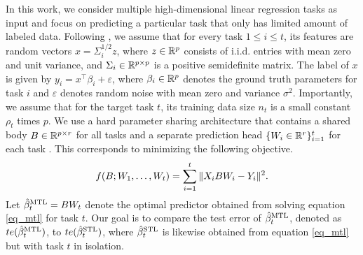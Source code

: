 In this work, we consider multiple high-dimensional linear regression tasks as input and focus on predicting a particular task that only has limited amount of labeled data.
Following \cite{HMRT19,BLLT20}, we assume that for every task $1\le i\le t$, its features are random vectors $x = \Sigma_i^{1/2}z$, where $z\in\mathbb{R}^p$ consists of i.i.d. entries with mean zero and unit variance, and $\Sigma_i\in\mathbb{R}^{p\times p}$ is a positive semidefinite matrix.
The label of $x$ is given by $y_i = x^{\top}\beta_i + \varepsilon$, where $\beta_i\in\mathbb{R}^p$ denotes the ground truth parameters for task $i$ and $\varepsilon$ denotes random noise with mean zero and variance $\sigma^2$.
Importantly, we assume that for the target task $t$, its training data size $n_t$ is a small constant $\rho_t$ times $p$. %
We use a hard parameter sharing architecture that contains a shared body $B\in\mathbb{R}^{p\times r}$ for all tasks and a separate prediction head $\{W_i \in \mathbb{R}^{r}\}_{i=1}^t$ for each task \cite{R17,MTDNN19}.
This corresponds to minimizing the following objective.
\begin{align}
	\label{eq_mtl}
	f(B; W_1, \dots, W_t) = \sum_{i=1}^t \|X_i B W_i - Y_i\|^2.
\end{align}
Let $\hat{\beta}_t^{\text{MTL}} = B W_t$ denote the optimal predictor obtained from solving equation \eqref{eq_mtl} for task $t$.
Our goal is to compare the test error of $\hat{\beta}_t^{\text{MTL}}$, denoted as $te(\hat{\beta}_t^{\text{MTL}})$, to $te(\hat{\beta}_t^{\text{STL}})$, where $\hat{\beta}_t^{\text{STL}}$ is likewise obtained from equation \eqref{eq_mtl} but with task $t$ in isolation.



